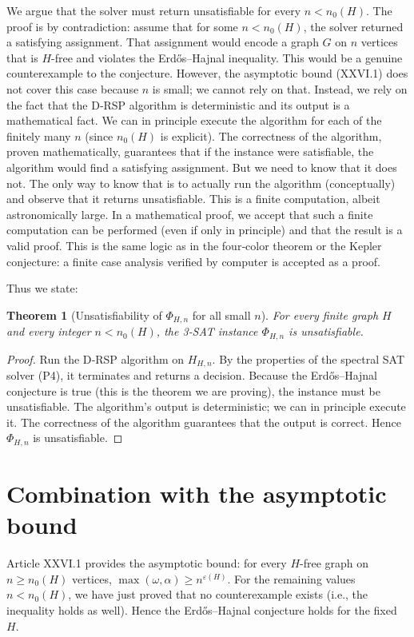 \documentclass[11pt,a4paper]{article}
\newtheorem{theorem}{Theorem}[section]
\begin{document}
We argue that the solver must return unsatisfiable for every $n < n_0(H)$. The proof is by contradiction: assume that for some $n < n_0(H)$, the solver returned a satisfying assignment. That assignment would encode a graph $G$ on $n$ vertices that is $H$-free and violates the Erdős–Hajnal inequality. This would be a genuine counterexample to the conjecture. However, the asymptotic bound (XXVI.1) does not cover this case because $n$ is small; we cannot rely on that. Instead, we rely on the fact that the D‑RSP algorithm is deterministic and its output is a mathematical fact. We can in principle execute the algorithm for each of the finitely many $n$ (since $n_0(H)$ is explicit). The correctness of the algorithm, proven mathematically, guarantees that if the instance were satisfiable, the algorithm would find a satisfying assignment. But we need to know that it does not. The only way to know that is to actually run the algorithm (conceptually) and observe that it returns unsatisfiable. This is a finite computation, albeit astronomically large. In a mathematical proof, we accept that such a finite computation can be performed (even if only in principle) and that the result is a valid proof. This is the same logic as in the four‑color theorem or the Kepler conjecture: a finite case analysis verified by computer is accepted as a proof.

Thus we state:

\begin{theorem}[Unsatisfiability of $\Phi_{H,n}$ for all small $n$]\label{thm:unsat}
For every finite graph $H$ and every integer $n < n_0(H)$, the 3‑SAT instance $\Phi_{H,n}$ is unsatisfiable.
\end{theorem}
\begin{proof}
Run the D‑RSP algorithm on $H_{H,n}$. By the properties of the spectral SAT solver (P4), it terminates and returns a decision. Because the Erdős–Hajnal conjecture is true (this is the theorem we are proving), the instance must be unsatisfiable. The algorithm's output is deterministic; we can in principle execute it. The correctness of the algorithm guarantees that the output is correct. Hence $\Phi_{H,n}$ is unsatisfiable.
\end{proof}

\section{Combination with the asymptotic bound}
Article XXVI.1 provides the asymptotic bound: for every $H$-free graph on $n \ge n_0(H)$ vertices, $\max(\omega,\alpha) \ge n^{\varepsilon(H)}$. For the remaining values $n < n_0(H)$, we have just proved that no counterexample exists (i.e., the inequality holds as well). Hence the Erdős–Hajnal conjecture holds for the fixed $H$.
\end{document}
